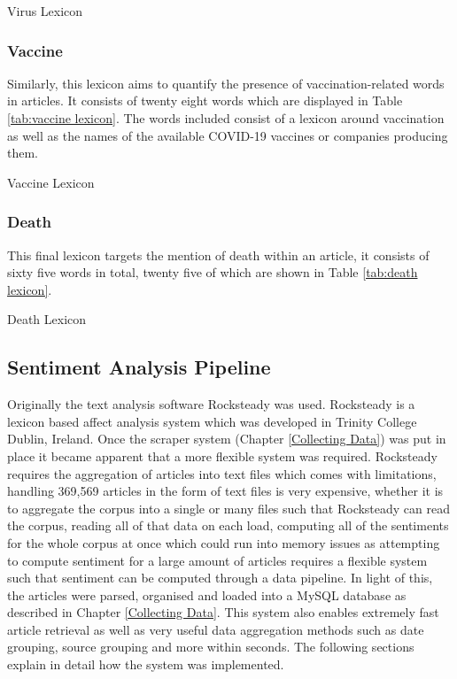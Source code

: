 \begin{table}[htb]
\caption{Virus Lexicon}
\label{tab:virus lexicon}
\centering
{}
\end{table}

\subsubsection{Vaccine}

Similarly, this lexicon aims to quantify the presence of vaccination-related words in articles. It consists of twenty eight words which are displayed in Table \ref{tab:vaccine lexicon}. The words included consist of a lexicon around vaccination as well as the names of the available COVID-19 vaccines or companies producing them.

\begin{table}[htb]
\caption{Vaccine Lexicon}
\label{tab:vaccine lexicon}
\centering
{}
\end{table}

\subsubsection{Death}

This final lexicon targets the mention of death within an article, it consists of sixty five words in total, twenty five of which are shown in Table \ref{tab:death lexicon}.

\begin{table}[htb]
\caption{Death Lexicon}
\label{tab:death lexicon}
\centering
{}
\end{table}

\subsection{Sentiment Analysis Pipeline}

Originally the text analysis software Rocksteady \cite{ahmad2014rocksteady} was used. Rocksteady is a lexicon based affect analysis system which was developed in Trinity College Dublin, Ireland. Once the scraper system (Chapter \ref{Collecting Data}) was put in place it became apparent that a more flexible system was required. Rocksteady requires the aggregation of articles into text files which comes with limitations, handling 369,569 articles in the form of text files is very expensive, whether it is to aggregate the corpus into a single or many files such that Rocksteady can read the corpus, reading all of that data on each load, computing all of the sentiments for the whole corpus at once which could run into memory issues as attempting to compute sentiment for a large amount of articles requires a flexible system such that sentiment can be computed through a data pipeline. In light of this, the articles were parsed, organised and loaded into a MySQL database as described in Chapter \ref{Collecting Data}. This system also enables extremely fast article retrieval as well as very useful data aggregation methods such as date grouping, source grouping and more within seconds. The following sections explain in detail how the system was implemented.
 

